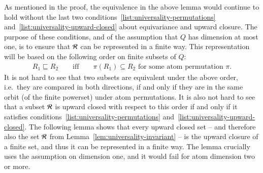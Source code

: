 As mentioned in the proof, the equivalence in the above lemma would continue to hold without the  last two conditions~\ref{list:universality-permutations} and~\ref{list:universality-upward-closed} about equivariance and upward closure. The purpose of these conditions,  and of the assumption that $Q$ has dimension at most one, is  to ensure that ${\mathcal R}$ can be represented in a finite way.  This representation will be based on the following order on finite subsets of $Q$:
\begin{align}
\label{eq:atom-dickson}
R_1 \sqsubseteq R_2 \qquad \text{iff} \qquad \pi(R_1) \subseteq R_2  \text{ for some atom permutation $\pi$}.
\end{align}
It is not hard to see that two subsets are equivalent under the above order, i.e.~they are compared in both directions,  if and only if they are in the same orbit (of the finite powerset) under atom permutations.
It is also not hard to see that a subset ${\mathcal R}$ is upward closed with respect to this order if and only if it satisfies conditions~\ref{list:universality-permutations} and~\ref{list:universality-upward-closed}. The following lemma shows that every upward closed set -- and therefore also the set ${\mathcal R}$ from Lemma~\ref{lem:universality-invariant} --  is the upward closure of a finite set, and thus it can be represented in a finite way. The lemma crucially uses the assumption on dimension one, and it would fail for atom dimension two or more. 


